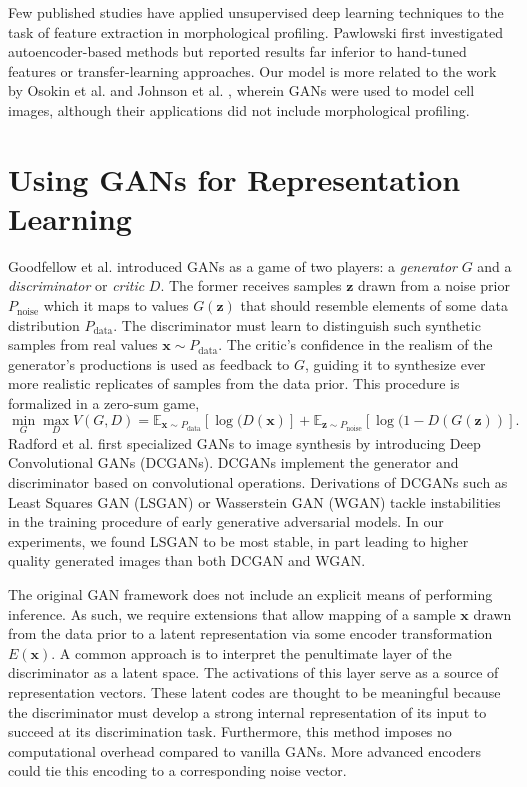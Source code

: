 \documentclass{article}
\begin{document}
Few published studies have applied unsupervised deep learning techniques to the task of feature extraction in morphological profiling. Pawlowski \cite{pawlowski2016msc} first investigated autoencoder-based methods but reported results far inferior to hand-tuned features or transfer-learning approaches. Our model is more related to the work by Osokin et al. \cite{osokin2017gans} and Johnson et al. \cite{johnson2017generative}, wherein GANs were used to model cell images, although their applications did not include morphological profiling.

\section{Using GANs for Representation Learning}
Goodfellow et al. \cite{goodfellow2014generative} introduced GANs as a game of
two players: a \emph{generator} $G$ and a \emph{discriminator} or \emph{critic} $D$. The former receives samples $\mathbf{z}$ drawn from a noise prior $P_{\text{noise}}$ which it maps to values $G(\mathbf{z})$ that should resemble elements of some data distribution $P_{\text{data}}$. The discriminator must learn to distinguish such synthetic samples from real values $\mathbf{x} \sim P_{\text{data}}$. The critic's confidence in the realism of the generator's productions is used as feedback to $G$, guiding it to synthesize ever more realistic replicates of samples from the data prior. This procedure is formalized in a zero-sum game,
\vspace{-1pt}
$$\min_G \max_D V(G, D) = \mathbb{E}_{\mathbf{x} \sim P_{\text{data}}}[\log(D(\mathbf{x})] + \mathbb{E}_{\mathbf{z} \sim P_{\text{noise}}}[\log(1 - D(G(\mathbf{z}))].$$
Radford et al. \cite{radford2015unsupervised} first specialized GANs to image synthesis by introducing Deep Convolutional GANs (DCGANs). DCGANs implement the generator and discriminator based on convolutional operations. Derivations of DCGANs such as Least Squares GAN (LSGAN) \cite{mao2016least} or Wasserstein GAN (WGAN) \cite{arjovsky2017wasserstein} tackle instabilities in the training procedure of early generative adversarial models. In our experiments, we found LSGAN to be most stable, in part leading to higher quality generated images than both DCGAN and WGAN.

The original GAN framework does not include an explicit means of performing inference. As such, we require extensions that allow mapping of a sample $\mathbf{x}$ drawn from the data prior to a latent representation via some encoder transformation $E(\mathbf{x})$. A common approach is to interpret the penultimate layer of the discriminator as a latent space. The activations of this layer serve as a source of representation vectors. These latent codes are thought to be meaningful because the discriminator must develop a strong internal representation of its input to succeed at its discrimination task. Furthermore, this method imposes no computational overhead compared to vanilla GANs. More advanced encoders could tie this encoding to a corresponding noise vector.
\end{document}
